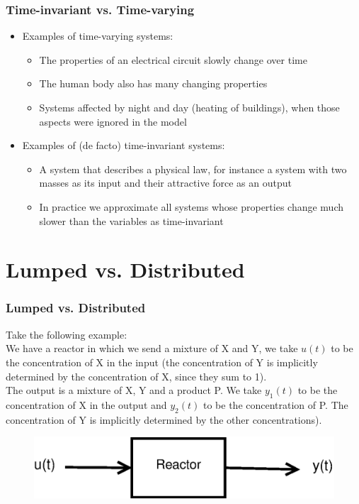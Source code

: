 \documentclass{beamer}
\begin{document}

\begin{frame}
\frametitle{Time-invariant vs. Time-varying}
\vspace{-4ex}
\begin{itemize}
\item Examples of time-varying systems:
\smallskip
\begin{itemize}
\item \normalsize{The properties of an electrical circuit slowly change over time}
\smallskip
\item \normalsize{The human body also has many changing properties}
\smallskip
\item \normalsize{Systems affected by night and day (heating of buildings), when those aspects were ignored in the model}
\end{itemize}
\medskip
\item Examples of (de facto) time-invariant systems:
\smallskip
\begin{itemize}
\item \normalsize{A system that describes a physical law, for instance a system with two masses as its input and their attractive force as an output}
\smallskip
\item \normalsize{In practice we approximate all systems whose properties change much slower than the variables as time-invariant}
\end{itemize}
\end{itemize}
\end{frame}

\section{Lumped vs. Distributed} 

\begin{frame}
\frametitle{Lumped vs. Distributed}
Take the following example:\\
\medskip
We have a reactor in which we send a mixture of X and Y, we take $u(t)$ to be the concentration of X in the input (the concentration of Y is implicitly determined by the concentration of X, since they sum to 1).\\
\medskip
The output is a mixture of X, Y and a product P. We take $y_{1}(t)$ to be the concentration of X in the output and $y_{2}(t)$ to be the concentration of P. The concentration of Y is implicitly determined by the other concentrations).\\
\begin{figure}[!htb]
\includegraphics[width=.8\linewidth]{chem}
\end{figure}
\end{frame}
\end{document}
